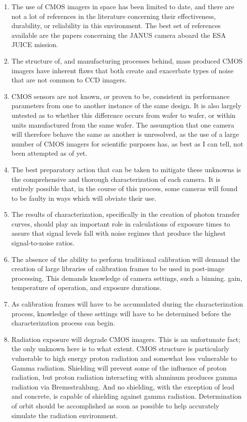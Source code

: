 \documentclass[10pt]{article}
\begin{document}
\begin{enumerate}
    \item The use of CMOS imagers in space has been limited to date, and there are not a lot of references in the literature concerning their effectiveness, durability, or reliability in this environment. The best set of references available are the papers concerning the JANUS camera aboard the ESA JUICE mission.
    \item The structure of, and manufacturing processes behind, mass produced CMOS imagers have inherent flaws that both create and exacerbate types of noise that are not common to CCD imagers.
    \item CMOS sensors are not known, or proven to be, consistent in performance parameters from one to another instance of the same design. It is also largely untested as to whether this difference occurs from wafer to wafer, or within units manufactured from the same wafer. The assumption that one camera will therefore behave the same as another is unresolved, as the use of a large number of CMOS imagers for scientific purposes has, as best as I can tell, not been attempted as of yet.
    \item The best preparatory action that can be taken to mitigate these unknowns is the comprehensive and thorough characterization of each camera. It is entirely possible that, in the course of this process, some cameras will found to be faulty in ways which will obviate their use.
    \item The results of characterization, specifically in the creation of photon transfer curves, should play an important role in calculations of exposure times to assure that signal levels fall with noise regimes that produce the highest signal-to-noise ratios.
    \item The absence of the ability to perform traditional calibration will demand the creation of large libraries of calibration frames to be used in post-image processing. This demands knowledge of camera settings, such a binning. gain, temperature of operation, and exposure durations.
    \item As calibration frames will have to be accumulated during the characterization process, 
    knowledge of these settings will have to be determined before the characterization process can begin.
    \item Radiation exposure will degrade CMOS imagers. This is an unfortunate fact; the only unknown here is to what extent. CMOS structure is particularly vulnerable to high energy proton radiation and somewhat less vulnerable to Gamma radiation. Shielding will prevent some of the influence of proton radiation, but proton radiation interacting with aluminum produces gamma radiation via Bremsstrahlung. And no shielding, with the exception of lead and concrete, is capable of shielding against gamma radiation. Determination of orbit should be accomplished as soon as possible to help accurately simulate the radiation environment.

\end{enumerate}
\end{document}
